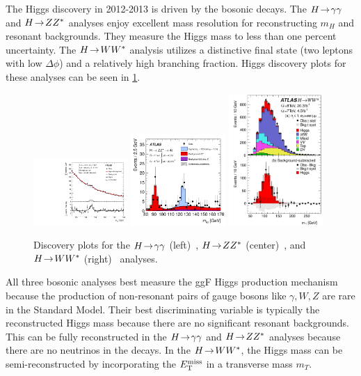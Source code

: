 The Higgs discovery in 2012-2013 is driven by the bosonic decays. The $H \!\rightarrow\! \gamma\gamma$ and $H \!\rightarrow\! ZZ^\ast$ analyses enjoy excellent mass resolution for reconstructing $m_H$ and resonant backgrounds. They measure the Higgs mass to less than one percent uncertainty. The $H \!\rightarrow\! WW^\ast$ analysis utilizes a distinctive final state (two leptons with low $\Delta\phi$) and a relatively high branching fraction. Higgs discovery plots for these analyses can be seen in \cref{fig:strategy-higgs-yyzzww}.

\begin{figure}[tp]
  \centering
  \includegraphics[width=0.32\textwidth]{figures/HIGG-2013-08/fig_13}
  \includegraphics[width=0.32\textwidth]{figures/HIGG-2013-21/fig_13a}
  \includegraphics[width=0.32\textwidth]{figures/HIGG-2013-13/fig_35}
  \caption{Discovery plots for the $H \!\rightarrow\! \gamma\gamma$ (left)~\cite{HIGG-2013-08}, $H \!\rightarrow\! ZZ^\ast$ (center)~\cite{HIGG-2013-21}, and $H \!\rightarrow\! WW^\ast$ (right)~\cite{HIGG-2013-13} analyses.}
  \label{fig:strategy-higgs-yyzzww}
\end{figure}

All three bosonic analyses best measure the ggF Higgs production mechanism because the production of non-resonant pairs of gauge bosons like $\gamma, W, Z$ are rare in the Standard Model. Their best discriminating variable is typically the reconstructed Higgs mass because there are no significant resonant backgrounds. This can be fully reconstructed in the $H \!\rightarrow\! \gamma\gamma$ and $H \!\rightarrow\! ZZ^\ast$ analyses because there are no neutrinos in the decays. In the $H \!\rightarrow\! WW^\ast$, the Higgs mass can be semi-reconstructed by incorporating the $E_{\mathrm{T}}^{\mathrm{miss}}$ in a transverse mass $m_T$.

